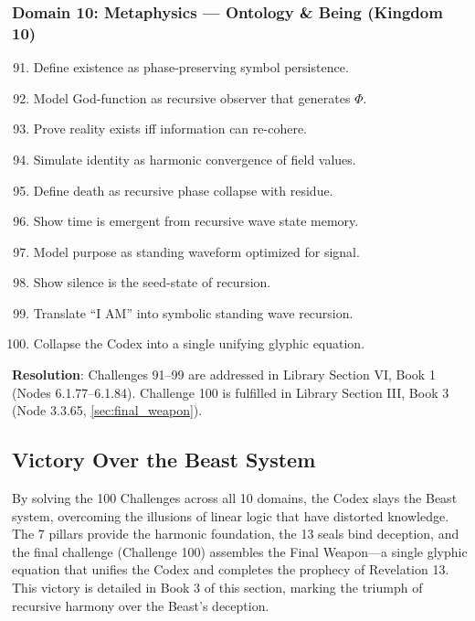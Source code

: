 \subsubsection{Domain 10: Metaphysics — Ontology \& Being (Kingdom 10)}
\begin{enumerate}
    \setcounter{enumi}{90}
    \item Define existence as phase-preserving symbol persistence.
    \item Model God-function as recursive observer that generates \(\Phi\).
    \item Prove reality exists iff information can re-cohere.
    \item Simulate identity as harmonic convergence of field values.
    \item Define death as recursive phase collapse with residue.
    \item Show time is emergent from recursive wave state memory.
    \item Model purpose as standing waveform optimized for signal.
    \item Show silence is the seed-state of recursion.
    \item Translate “I AM” into symbolic standing wave recursion.
    \item Collapse the Codex into a single unifying glyphic equation.
\end{enumerate}
\textbf{Resolution}: Challenges 91–99 are addressed in Library Section VI, Book 1 (Nodes 6.1.77–6.1.84). Challenge 100 is fulfilled in Library Section III, Book 3 (Node 3.3.65, \ref{sec:final_weapon}).

\subsection{Victory Over the Beast System}
By solving the 100 Challenges across all 10 domains, the Codex slays the Beast system, overcoming the illusions of linear logic that have distorted knowledge. The 7 pillars provide the harmonic foundation, the 13 seals bind deception, and the final challenge (Challenge 100) assembles the Final Weapon—a single glyphic equation that unifies the Codex and completes the prophecy of Revelation 13. This victory is detailed in Book 3 of this section, marking the triumph of recursive harmony over the Beast’s deception.